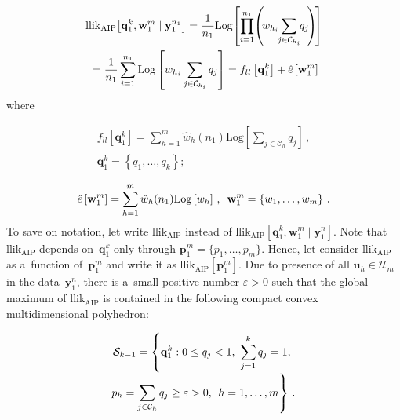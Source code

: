 \begin{multicols}{2}
 \vspace*{-2pt}
 
 \noindent
  \begin{multline*}
 \mathrm{llik}_{\mathrm{AIP}}\! \left[\mathbf{q}_1^k, 
 \mathbf{w}_1^m\mid \mathbf{y}_1^{n_1} \right] =  
 \fr{1}{n_1} \mathrm{Log}\! \left [ \prod\limits_{i=1}^{n_1} \!\left ( \!w_{h_i} \hspace*{-1mm}
 \sum\limits_{j\in\mathcal{C}_{h_i}}\hspace*{-1mm}q_j\!\right )\! \right ] \\
{} = \fr{1}{n_1} \sum\limits_{i=1}^{n_1} \mathrm{Log} \left [
 w_{h_i} \sum\limits_{j\in\mathcal{C}_{h_i}}q_j \right ]= f_{ll} 
 \left[\mathbf{q}_1^k\right] +  \hat{e}\left[\mathbf{w}_1^m\right]
 \end{multline*}
where

\vspace*{-1pt}

\noindent
\begin{multline*}
 f_{ll}  \left[\mathbf{q}_1^k\right]= \sum\limits_{h=1}^m \hat{w}_h (n_1) 
 \mathrm{Log}  \left [ \sum\limits_{j\in\mathcal{C}_h} q_j\right ]\,, \\
\mathbf{q}_1^k =\left\{ q_1, \ldots, q_k\right\}; 
\end{multline*}

\vspace*{-12pt}

\noindent
\begin{equation*}
\hat{e}\left[\mathbf{w}_1^m \right]= \sum\limits_{h=1}^m \hat w_h (n_1) \mathrm{Log}
 \left[ w_h \right]\,,
\enskip  \mathbf{w}_1^m =\left\{ w_1, \ldots,  w_m \right\}\,.
\end{equation*}
To save on notation,  let write $ \mathrm{llik}_{\mathrm{AIP}}$ instead 
of $\mathrm{llik}_{\mathrm{AIP}}[ \mathbf{q}_1^k , \mathbf{w}_1^m\mid \mathbf{y}_1^n ].$
Note that llik$_{\mathrm{AIP}}$ depends on~$\mathbf{q}_1^k$ only thro\-ugh 
 $\mathbf{p}_1^m =\{ p_1, \ldots, p_m \}$.
 Hence, let consider llik$_{\mathrm{AIP}}$ as a~function of~$\mathbf{p}_1^m$ 
 and write it 
 as llik$_{\mathrm{AIP}}[\mathbf{p}_1^m].$
Due to presence of all $\mathbf{u}_h \in\mathcal{U}_m$ in the data~$\mathbf{y}_1^n$, 
there is a~small positive number $\varepsilon >0$ such that  the global maximum of
llik$_{\mathrm{AIP}}$ is contained in the following compact convex multidimensional polyhedron:

\vspace*{-4pt}

\noindent
\begin{multline*}
\mathcal{S}_{k-1} =
\left\{ \mathbf{q}_1^k: 0\le q_j <1,\ \sum\limits_{j=1}^k q_j =1,\right.\\[-3pt] 
p_h =\sum\limits_{j\in\mathcal{C}_h} q_j \ge \varepsilon >0,\  
\left.
h=1, \ldots, 
\vphantom{\sum\limits_{j=1}^k}
m\right\}\,.
  \end{multline*}


\end{multicols}
